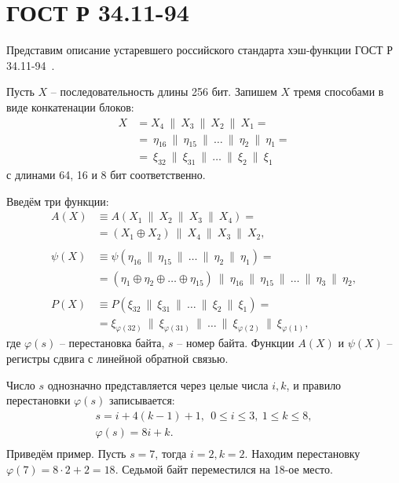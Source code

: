 \section{ГОСТ Р 34.11-94}

Представим описание устаревшего российского стандарта хэш-функции ГОСТ Р 34.11-94~\cite{GOST-94}.

Пусть $X$ -- последовательность длины 256 бит. Запишем $X$ тремя способами в виде конкатенации блоков:
\[ \begin{array}{ll}
    X & = X_4 ~\|~ X_3 ~\|~ X_2 ~\|~ X_1 = \\
    & = ~ \eta_{16} ~\|~ \eta_{15} ~\|~ \dots ~\|~ \eta_2 ~\|~ \eta_1 = \\
    & = ~ \xi_{32} ~\|~ \xi_{31} ~\|~ \dots ~\|~ \xi_2 ~\|~ \xi_1
\end{array} \]
с длинами 64, 16 и 8 бит соответственно.

Введём три функции:
\[ \begin{array}{ll}
    A(X) & \equiv A(X_1 ~\|~ X_2 ~\|~ X_3 ~\|~ X_4) = \\
        & = \left( X_1 \oplus X_2 \right) ~\|~ X_4 ~\|~ X_3 ~\|~ X_2, \\
    & \\
    \psi(X) & \equiv \psi(\eta_{16} ~\|~ \eta_{15} ~\|~ \dots ~\|~ \eta_2 ~\|~ \eta_1) = \\
        & = \left( \eta_1 \oplus \eta_2 \oplus \dots \oplus \eta_{15} \right) ~\|~
            \eta_{16} ~\|~ \eta_{15} ~\|~ \dots ~\|~ \eta_3 ~\|~ \eta_2, \\
    & \\
    P(X) & \equiv P(\xi_{32} ~\|~ \xi_{31} ~\|~ \dots ~\|~ \xi_2 ~\|~ \xi_1) = \\
        & = \xi_{\varphi(32)} ~\|~ \xi_{\varphi(31)} ~\|~ \dots ~\|~ \xi_{\varphi(2)} ~\|~ \xi_{\varphi(1)},
\end{array} \]
где $\varphi(s)$ -- перестановка байта, $s$ -- номер байта. Функции $A(X)$ и $\psi(X)$ -- регистры сдвига с линейной обратной связью.

Число $s$ однозначно представляется через целые числа $i,k$, и правило перестановки $\varphi(s)$ записывается:
\[ \begin{array}{c}
    s = i + 4 (k - 1) + 1, ~~ 0 \le i \le 3, ~ 1 \le k \le 8, \\
    \varphi(s) = 8 i + k. \\
\end{array} \]
Приведём пример. Пусть $s = 7$, тогда $i=2, k=2$. Находим перестановку $\varphi(7) = 8 \cdot 2 + 2 = 18$. Седьмой байт переместился на 18-ое место.


